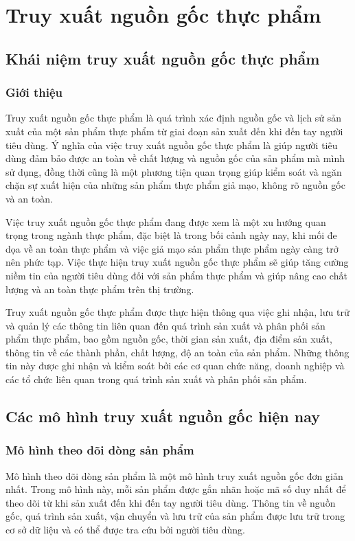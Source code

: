 \chapter{Truy xuất nguồn gốc thực phẩm}
\section{Khái niệm truy xuất nguồn gốc thực phẩm}
\subsection{Giới thiệu}

Truy xuất nguồn gốc thực phẩm là quá trình xác định nguồn gốc và lịch sử sản xuất
của một sản phẩm thực phẩm từ giai đoạn sản xuất đến khi đến tay người tiêu dùng. Ý
nghĩa của việc truy xuất nguồn gốc thực phẩm là giúp người tiêu dùng đảm bảo được
an toàn về chất lượng và nguồn gốc của sản phẩm mà mình sử dụng, đồng thời cũng là
một phương tiện quan trọng giúp kiểm soát và ngăn chặn sự xuất hiện của những sản
phẩm thực phẩm giả mạo, không rõ nguồn gốc và an toàn.

Việc truy xuất nguồn gốc thực phẩm đang được xem là một xu hướng quan trọng
trong ngành thực phẩm, đặc biệt là trong bối cảnh ngày nay, khi mối đe dọa về an toàn
thực phẩm và việc giả mạo sản phẩm thực phẩm ngày càng trở nên phức tạp. Việc thực
hiện truy xuất nguồn gốc thực phẩm sẽ giúp tăng cường niềm tin của người tiêu dùng
đối với sản phẩm thực phẩm và giúp nâng cao chất lượng và an toàn thực phẩm trên thị
trường.

Truy xuất nguồn gốc thực phẩm được thực hiện thông qua việc ghi nhận, lưu trữ
và quản lý các thông tin liên quan đến quá trình sản xuất và phân phối sản phẩm thực
phẩm, bao gồm nguồn gốc, thời gian sản xuất, địa điểm sản xuất, thông tin về các thành
phần, chất lượng, độ an toàn của sản phẩm. Những thông tin này được ghi nhận và kiểm
soát bởi các cơ quan chức năng, doanh nghiệp và các tổ chức liên quan trong quá trình
sản xuất và phân phối sản phẩm.

\section{Các mô hình truy xuất nguồn gốc hiện nay}
\subsection{Mô hình theo dõi dòng sản phẩm }
Mô hình theo dõi dòng sản phẩm là một mô hình 
truy xuất nguồn gốc đơn giản nhất. Trong mô hình này, mỗi sản phẩm được gắn 
nhãn hoặc mã số duy nhất để theo dõi từ khi sản xuất đến khi đến tay người 
tiêu dùng. Thông tin về nguồn gốc, quá trình sản xuất, vận chuyển và lưu trữ 
của sản phẩm được lưu trữ trong cơ sở dữ liệu và có thể được tra cứu bởi người tiêu dùng.

